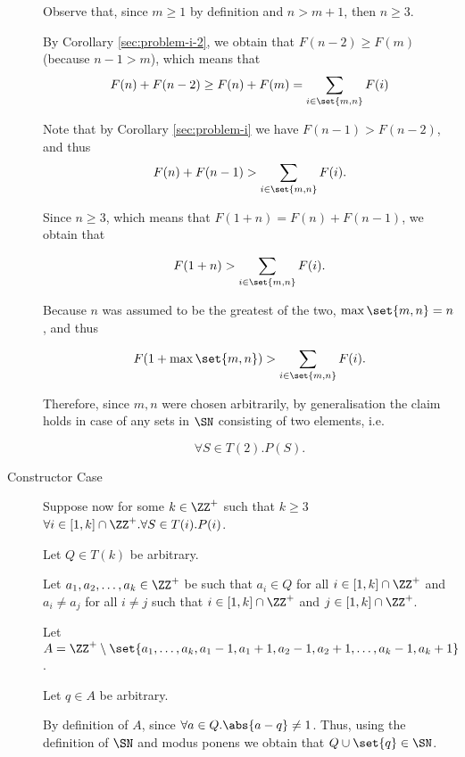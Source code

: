 \documentclass[11pt, letterpaper]{scrartcl}
\begin{document}
\begin{soln}
\begin{description}
    Observe that, since $m\geq 1$ by definition and $n>m+1$, then
    $n\geq 3$.

    By Corollary \ref{sec:problem-i-2}, we obtain that
    $F(n-2)\geq F(m)$ (because $n-1 > m$), which means that
    \begin{equation*}
      F(n) + F(n-2)\geq F(n) + F(m) = \sum_{i\in\set{m,n}}F(i)
    \end{equation*}

    Note that by Corollary \ref{sec:problem-i} we have
    $F(n-1) > F(n-2)$, and thus
    \begin{equation*}
      F(n) + F(n-1) > \sum_{i\in\set{m,n}}F(i).
    \end{equation*}

    Since $n\geq 3$, which means that $F(1+n) = F(n)+F(n-1)$, we obtain that

    \begin{equation*}
      F(1+n) > \sum_{i\in\set{m,n}}F(i).
    \end{equation*}

    Because $n$ was assumed to be the greatest of the two, $\max \set{m, n} = n$, and thus
    
    \begin{equation*}
      F(1+\max\set{m, n}) > \sum_{i\in\set{m,n}}F(i).
    \end{equation*}

    Therefore, since $m, n$ were chosen arbitrarily, by generalisation
    the claim holds in case of any sets in $\SN$ consisting of two
    elements, i.e.

    \[ \forall S\in T(2).P(S). \]

  \item[Constructor Case] \hfill

    Suppose now for some $k\in\ZZ^{+}$ such that $k\geq 3$
    $\forall i\in [1, k]\cap \ZZ^{+}.\forall S\in T(i).P(i)$.

    Let $Q\in T(k)$ be arbitrary.


    Let $a_1, a_2, \dots, a_k\in \ZZ^{+}$ be such that $a_i\in Q$ for
    all $i\in [1,k]\cap \ZZ^+$ and $a_i\neq a_j$ for all $i\neq j$
    such that $i\in [1,k]\cap \ZZ^+$ and $j\in [1,k]\cap \ZZ^+$.

    Let $A = \ZZ^+\setminus\set{a_1, \dots, a_k, a_1-1,a_1+1, a_2-1, a_2+1, \dots, a_k-1, a_k+1}$.

    Let $q\in A$ be arbitrary.

    By definition of $A$, since $\forall a\in Q.\abs{a-q}\neq
    1$. Thus, using the definition of $\SN$ and modus ponens we obtain
    that $Q\cup \set{q}\in\SN$.


\end{description}
\end{soln}
\end{document}
